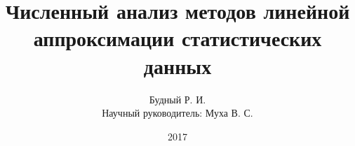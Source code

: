 \title{Численный анализ методов линейной аппроксимации статистических данных}
\author{%
    \small{Будный Р. И.} \\
    \smallskip
    \scriptsize{Научный руководитель: Муха В. С.}
}

\date{2017}
